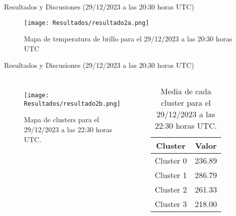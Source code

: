 \documentclass[aspectratio=169,xcolor=dvipsnames]{beamer}
\begin{document}
\begin{frame}{Resultados y Discusiones (29/12/2023 a las 20:30 horas UTC)}
\begin{figure}
    \centering
    \texttt{[image: Resultados/resultado2a.png]}
    \caption{Mapa de temperatura de brillo para el 29/12/2023 a las 20:30 horas UTC}
    \label{fig8}
\end{figure}
\end{frame}
\begin{frame}{Resultados y Discusiones (29/12/2023 a las 20:30 horas UTC)}
    \begin{columns}

        \begin{figure}
            \centering
            \texttt{[image: Resultados/resultado2b.png]}
            {\footnotesize %
            \caption{Mapa de clusters para el 29/12/2023 a las 22:30 horas UTC.}
            \label{fig9}
            }
        \end{figure}

        \centering
        \begin{table}[h!]
            \centering
            {\footnotesize %
            \begin{tabular}{|c|c|}
                \hline
                \textbf{Cluster} & \textbf{Valor} \\
                \hline
                Cluster 0 & 236.89 \\
                Cluster 1 & 286.79 \\
                Cluster 2 & 261.33 \\
                Cluster 3 & 218.00 \\                
                \hline
            \end{tabular}
            \caption{Media de cada cluster para el 29/12/2023 a las 22:30 horas UTC.}
            }
        \end{table}

    \end{columns}
\end{frame}
\end{document}
